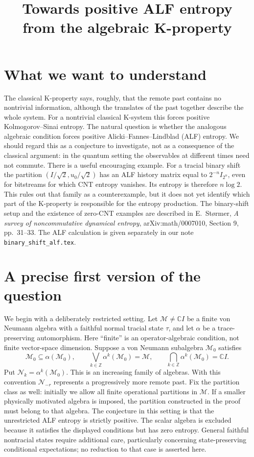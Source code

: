 \documentclass[11pt,a4paper]{article}
\begin{document}
\title{Towards positive ALF entropy from the algebraic K-property}
\author{}
\date{}
\maketitle
\section{What we want to understand}
The classical K-property says, roughly, that the remote past contains no nontrivial information, although the translates of the past together describe the whole system. For a nontrivial classical K-system this forces positive Kolmogorov--Sinai entropy. The natural question is whether the analogous algebraic condition forces positive Alicki--Fannes--Lindblad (ALF) entropy. We should regard this as a conjecture to investigate, not as a consequence of the classical argument: in the quantum setting the observables at different times need not commute.
There is a useful encouraging example. For a tracial binary shift the partition $(I/\sqrt2,u_0/\sqrt2)$ has an ALF history matrix equal to $2^{-n}I_{2^n}$, even for bitstreams for which CNT entropy vanishes. Its entropy is therefore $n\log2$. This rules out that family as a counterexample, but it does not yet identify which part of the K-property is responsible for the entropy production. The binary-shift setup and the existence of zero-CNT examples are described in E.~St\o rmer, \emph{A survey of noncommutative dynamical entropy}, arXiv:math/0007010, Section 9, pp.~31--33. The ALF calculation is given separately in our note \texttt{binary\_shift\_alf.tex}.
\section{A precise first version of the question}
We begin with a deliberately restricted setting. Let $\mathcal M\ne\mathbb CI$ be a finite von Neumann algebra with a faithful normal tracial state $\tau$, and let $\alpha$ be a trace-preserving automorphism. Here ``finite'' is an operator-algebraic condition, not finite vector-space dimension. Suppose a von Neumann subalgebra $\mathcal M_0$ satisfies
\[\mathcal M_0\subseteq\alpha(\mathcal M_0),\qquad\bigvee_{k\in\mathbb Z}\alpha^k(\mathcal M_0)=\mathcal M,\qquad\bigcap_{k\in\mathbb Z}\alpha^k(\mathcal M_0)=\mathbb CI.\]
Put $\mathcal N_k=\alpha^k(\mathcal M_0)$. This is an increasing family of algebras. With this convention $\mathcal N_{-r}$ represents a progressively more remote past. Fix the partition class as well: initially we allow all finite operational partitions in $\mathcal M$. If a smaller physically motivated algebra is imposed, the partition constructed in the proof must belong to that algebra.
The conjecture in this setting is that the unrestricted ALF entropy is strictly positive. The scalar algebra is excluded because it satisfies the displayed conditions but has zero entropy. General faithful nontracial states require additional care, particularly concerning state-preserving conditional expectations; no reduction to that case is asserted here.
\end{document}

